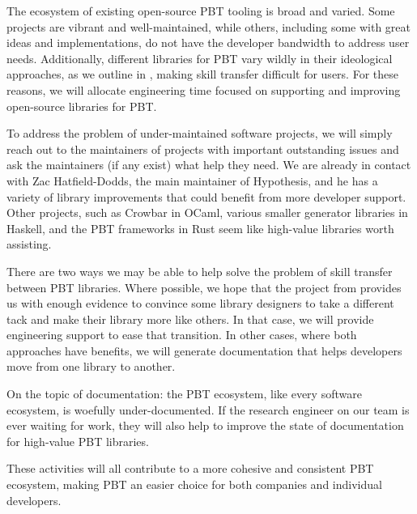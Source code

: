 The ecosystem of existing open-source PBT tooling is broad and varied. Some
projects are vibrant and well-maintained, while others, including some with
great ideas and implementations, do not have the developer bandwidth to address
user needs. Additionally, different libraries for PBT vary wildly in their
ideological approaches, as we outline in , making
skill transfer difficult for users. For these reasons, we will allocate
engineering time focused on supporting and improving open-source libraries for
PBT.

To address the problem of under-maintained software projects, we will simply
reach out to the maintainers of projects with important outstanding issues and
ask the maintainers (if any exist) what help they need. We are already in
contact with Zac Hatfield-Dodds, the main maintainer of Hypothesis, and he has a
variety of library improvements that could benefit from more developer support.
Other projects, such as Crowbar in OCaml, various smaller generator libraries in
Haskell, and the PBT frameworks in Rust seem like high-value libraries worth
assisting.

There are two ways we may be able to help solve the problem of skill transfer
between PBT libraries. Where possible, we hope that the project from
 provides us with enough evidence to convince some
library designers to take a different tack and make their library more like
others. In that case, we will provide engineering support to ease that
transition. In other cases, where both approaches have benefits, we will
generate documentation that helps developers move from one library to another.

On the topic of documentation: the PBT ecosystem, like every software ecosystem,
is woefully under-documented. If the research engineer on our team is ever
waiting for work, they will also help to improve the state of documentation for
high-value PBT libraries.

These activities will all contribute to a more cohesive and consistent PBT
ecosystem, making PBT an easier choice for both companies and individual
developers.

